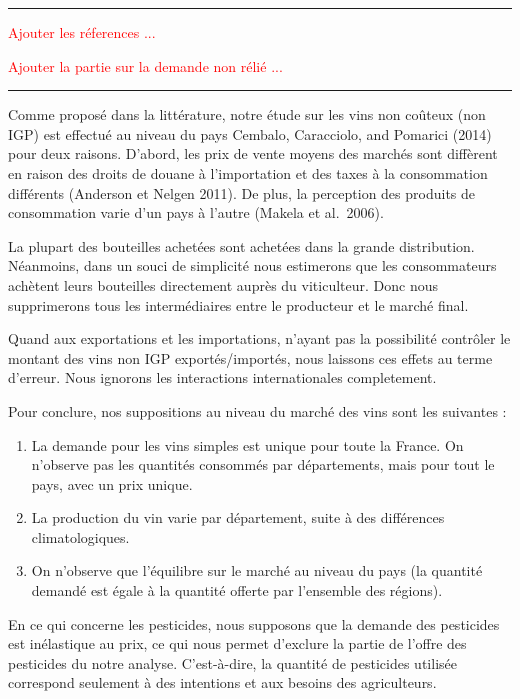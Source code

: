 \documentclass[11pt,]{article}
\providecommand{\tightlist}{%
  \setlength{\itemsep}{0pt}\setlength{\parskip}{0pt}}
\begin{document}
\noindent

\rule[0.5ex]{\linewidth}{1pt}

\textcolor{red}{Ajouter les réferences ...}

\textcolor{red}{Ajouter la partie sur la demande non rélié ...}

\noindent

\rule[0.5ex]{\linewidth}{1pt}

Comme proposé dans la littérature, notre étude sur les vins non coûteux
(non IGP) est effectué au niveau du pays Cembalo, Caracciolo, and
Pomarici (2014) pour deux raisons. D'abord, les prix de vente moyens des
marchés sont diffèrent en raison des droits de douane à l'importation et
des taxes à la consommation différents (Anderson et Nelgen 2011). De
plus, la perception des produits de consommation varie d'un pays à
l'autre (Makela et al.~2006).

La plupart des bouteilles achetées sont achetées dans la grande
distribution. Néanmoins, dans un souci de simplicité nous estimerons que
les consommateurs achètent leurs bouteilles directement auprès du
viticulteur. Donc nous supprimerons tous les intermédiaires entre le
producteur et le marché final.

Quand aux exportations et les importations, n'ayant pas la possibilité
contrôler le montant des vins non IGP exportés/importés, nous laissons
ces effets au terme d'erreur. Nous ignorons les interactions
internationales completement.

Pour conclure, nos suppositions au niveau du marché des vins sont les
suivantes :

\begin{enumerate}
\def\labelenumi{\arabic{enumi}.}
\tightlist
\item
  La demande pour les vins simples est unique pour toute la France. On
  n'observe pas les quantités consommés par départements, mais pour tout
  le pays, avec un prix unique.
\item
  La production du vin varie par département, suite à des différences
  climatologiques.
\item
  On n'observe que l'équilibre sur le marché au niveau du pays (la
  quantité demandé est égale à la quantité offerte par l'ensemble des
  régions).
\end{enumerate}

En ce qui concerne les pesticides, nous supposons que la demande des
pesticides est inélastique au prix, ce qui nous permet d'exclure la
partie de l'offre des pesticides du notre analyse. C'est-à-dire, la
quantité de pesticides utilisée correspond seulement à des intentions et
aux besoins des agriculteurs.
\end{document}
